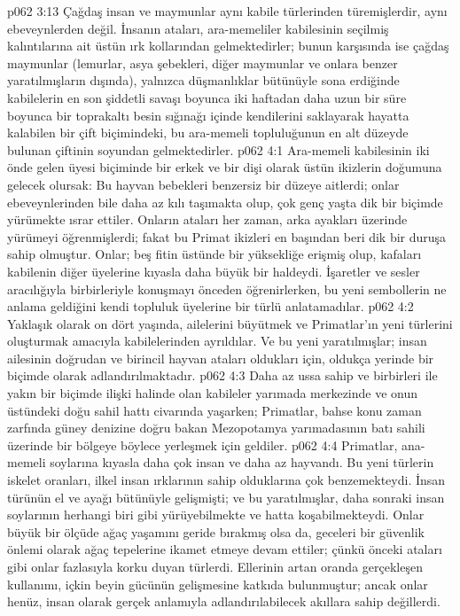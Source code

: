 \vs p062 3:13 Çağdaş insan ve maymunlar aynı kabile türlerinden türemişlerdir, aynı ebeveynlerden değil. İnsanın ataları, ara\hyp{}memeliler kabilesinin seçilmiş kalıntılarına ait üstün ırk kollarından gelmektedirler; bunun karşısında ise çağdaş maymunlar (lemurlar, asya şebekleri, diğer maymunlar ve onlara benzer yaratılmışların dışında), yalnızca düşmanlıklar bütünüyle sona erdiğinde kabilelerin en son şiddetli savaşı boyunca iki haftadan daha uzun bir süre boyunca bir toprakaltı besin sığınağı içinde kendilerini saklayarak hayatta kalabilen bir çift biçimindeki, bu ara\hyp{}memeli topluluğunun en alt düzeyde bulunan çiftinin soyundan gelmektedirler.
\vs p062 4:1 Ara\hyp{}memeli kabilesinin iki önde gelen üyesi biçiminde bir erkek ve bir dişi olarak üstün ikizlerin doğumuna gelecek olursak: Bu hayvan bebekleri benzersiz bir düzeye aitlerdi; onlar ebeveynlerinden bile daha az kılı taşımakta olup, çok genç yaşta dik bir biçimde yürümekte ısrar ettiler. Onların ataları her zaman, arka ayakları üzerinde yürümeyi öğrenmişlerdi; fakat bu Primat ikizleri en başından beri dik bir duruşa sahip olmuştur. Onlar; beş fitin üstünde bir yüksekliğe erişmiş olup, kafaları kabilenin diğer üyelerine kıyasla daha büyük bir haldeydi. İşaretler ve sesler aracılığıyla birbirleriyle konuşmayı önceden öğrenirlerken, bu yeni sembollerin ne anlama geldiğini kendi topluluk üyelerine bir türlü anlatamadılar.
\vs p062 4:2 Yaklaşık olarak on dört yaşında, ailelerini büyütmek ve Primatlar’ın yeni türlerini oluşturmak amacıyla kabilelerinden ayrıldılar. Ve bu yeni yaratılmışlar; insan ailesinin doğrudan ve birincil hayvan ataları oldukları için, oldukça yerinde bir biçimde  olarak adlandırılmaktadır.
\vs p062 4:3 Daha az ussa sahip ve birbirleri ile yakın bir biçimde ilişki halinde olan kabileler yarımada merkezinde ve onun üstündeki doğu sahil hattı civarında yaşarken; Primatlar, bahse konu zaman zarfında güney denizine doğru bakan Mezopotamya yarımadasının batı sahili üzerinde bir bölgeye böylece yerleşmek için geldiler.
\vs p062 4:4 Primatlar, ana\hyp{}memeli soylarına kıyasla daha çok insan ve daha az hayvandı. Bu yeni türlerin iskelet oranları, ilkel insan ırklarının sahip olduklarına çok benzemekteydi. İnsan türünün el ve ayağı bütünüyle gelişmişti; ve bu yaratılmışlar, daha sonraki insan soylarının herhangi biri gibi yürüyebilmekte ve hatta koşabilmekteydi. Onlar büyük bir ölçüde ağaç yaşamını geride bırakmış olsa da, geceleri bir güvenlik önlemi olarak ağaç tepelerine ikamet etmeye devam ettiler; çünkü önceki ataları gibi onlar fazlasıyla korku duyan türlerdi. Ellerinin artan oranda gerçekleşen kullanımı, içkin beyin gücünün gelişmesine katkıda bulunmuştur; ancak onlar henüz, insan olarak gerçek anlamıyla adlandırılabilecek akıllara sahip değillerdi.
